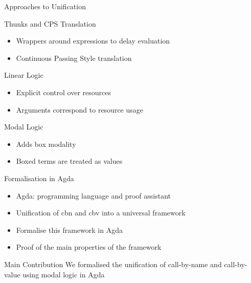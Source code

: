 \documentclass{beamer}
\theoremstyle{definition}
\begin{document}
  \begin{frame}{Approaches to Unification}

  \begin{block}{\alert{Thunks} and \alert{CPS} Translation}
    \begin{itemize}
      \item[\textbullet] Wrappers around expressions to delay evaluation
      \item[\textbullet] Continuous Passing Style translation 
    \end{itemize}
    
  \end{block}\pause

  \begin{block}{\alert{Linear} Logic}
    \begin{itemize}
      \item[\textbullet] Explicit control over resources
      \item[\textbullet] Arguments correspond to resource usage
    \end{itemize}
  \end{block} \pause

  \begin{block}{\alert{Modal} Logic}
    \begin{itemize}
      \item[\textbullet] Adds box modality
      \item[\textbullet] Boxed terms are treated as values
    \end{itemize}
  \end{block}

  \end{frame}

  \begin{frame}{Formalisation in Agda}
    \begin{itemize}
      \item[\textbullet] \alert{Agda}: programming language and proof assistant
      \item[\textbullet] Unification of \alert{\textsf{cbn}} and \alert{\textsf{cbv}} into a universal framework  
      \item[\textbullet] Formalise this framework in \alert{Agda}
      \item[\textbullet] Proof of the main properties of the framework
    \end{itemize}
  \end{frame}

  \begin{frame}{Main Contribution}
    \Large
    We formalised the unification of call-by-name and call-by-value using modal logic in Agda
  \end{frame}
\end{document}
